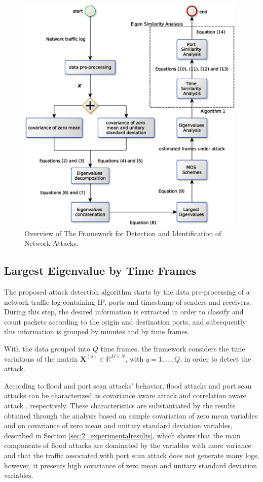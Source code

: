 \begin{figure}[h!]
	\centering
     \includegraphics[width=11cm]{figures/mos_eigen_similarity.eps}
     \caption{Overview of The Framework for Detection and Identification of Network Attacks.}
     \label{fig:2_fig80}
\end{figure}

\subsection{Largest Eigenvalue by Time Frames}
\label{sec:2_prop_LargestEigenvaluebyTimeFrames}

The proposed attack detection algorithm starts by the data pre-processing of a network traffic log containing IP, ports and timestamp of senders and receivers. During this step, the desired information is extracted in order to classify and count packets according to the origin and destination ports, and subsequently this information is grouped by minutes and by time frames.

With the data grouped into $Q$ time frames, the framework considers the time variations of the matrix $\boldsymbol{X}^{(q)} \in \mathbb{R}^{M\times{N}}$, with $q = 1, \ldots, Q$, in order to detect the attack. 

According to flood and port scan attacks' behavior, flood attacks and port scan attacks can be characterized as covariance aware attack \citep{jin2004covariance} and correlation aware attack \citep{lakhina2005mining}, respectively. These characteristics are substantiated by the results obtained through the analysis based on sample covariation of zero mean variables and on covariance of zero mean and unitary standard deviation variables, described in Section \ref{sec:2_experimentalresults}, which shows that the main components of flood attacks are dominated by the variables with more variance and that the traffic associated with port scan attack does not generate many logs, however, it presents high covariance of zero mean and unitary standard deviation variables.

